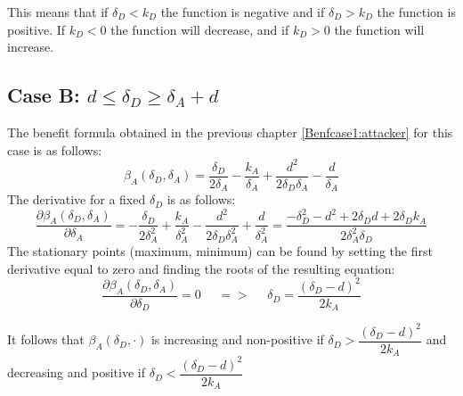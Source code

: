 This means that if $\delta_{D} < k_{D}$  the function is negative and if $\delta_{D} > k_{D}$ the function is positive. If $k_{D} < 0$ the function will decrease, and if $k_{D} > 0$ the function will increase.



\subsection*{Case B: $d \leq \delta_{D} \geq \delta_{A} + d$}

The benefit formula obtained in the previous chapter \ref{Benfcase1:attacker} for this case is as follows:
\begin{equation*}
\beta_{A}(\delta_{D},\delta_{A}) =\dfrac{\delta_{D}}{2\delta_{A}} - \dfrac{k_{A}}{\delta_{A}} + \dfrac{d^{2}}{2\delta_{D}\delta_{A}} - \dfrac{d}{\delta_{A}}
\end{equation*}
The derivative for a fixed $\delta_{D}$ is as follows:
\begin{equation*}
\dfrac{\partial \beta_{A}(\delta_{D},\delta_{A})}{\partial \delta_{A}} = -\dfrac{\delta_{D}}{2\delta_{A}^{2}} + \dfrac{k_{A}}{\delta_{A}^{2}} - \dfrac{d^{2}}{2\delta_{D}\delta_{A}^{2}} + \dfrac{d}{\delta_{A}^{2}} = \dfrac{-\delta_{D}^{2} - d^{2} + 2\delta_{D}d + 2\delta_{D}k_{A}}{2\delta_{A}^{2}\delta_{D}}
\end{equation*}
The stationary points (maximum, minimum) can be found by setting the first derivative equal to zero and finding the roots of the resulting equation:
\begin{equation*}
\frac{\partial \beta_{A}(\delta_{D},\delta_{A})}{\partial \delta_{D}} =0 ~~~~~~ =>~~~~~~  \delta_{D}= \dfrac{(\delta_{D}-d)^{2}}{2k_{A}}
\end{equation*}

It follows that $\beta_{A}(\delta_{D},\cdot)$ is increasing and non-positive if $\delta_{D}> \dfrac{(\delta_{D}-d)^{2}}{2k_{A}}$ and decreasing and positive if $\delta_{D} < \dfrac{(\delta_{D}-d)^{2}}{2k_{A}}$  \\

